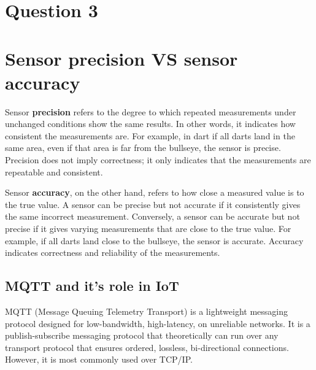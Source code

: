 \section{Question 3}

\section{Sensor precision VS sensor accuracy}

Sensor \textbf{precision} refers to the degree to which repeated measurements under unchanged conditions show the same results. In other words, it indicates how consistent the measurements are. For example, in dart if all darts land in the same area, even if that area is far from the bullseye, the sensor is precise. Precision does not imply correctness; it only indicates that the measurements are repeatable and consistent.

Sensor \textbf{accuracy}, on the other hand, refers to how close a measured value is to the true value. A sensor can be precise but not accurate if it consistently gives the same incorrect measurement. Conversely, a sensor can be accurate but not precise if it gives varying measurements that are close to the true value. For example, if all darts land close to the bullseye, the sensor is accurate. Accuracy indicates correctness and reliability of the measurements.


\subsection{MQTT and it's role in IoT}

MQTT (Message Queuing Telemetry Transport) is a lightweight messaging protocol designed for low-bandwidth, high-latency, on unreliable networks\cite{mqtt_org}. 
It is a publish-subscribe messaging protocol that theoretically can run over any transport protocol that ensures ordered, lossless, bi-directional connections. However, it is most commonly used over TCP/IP.

